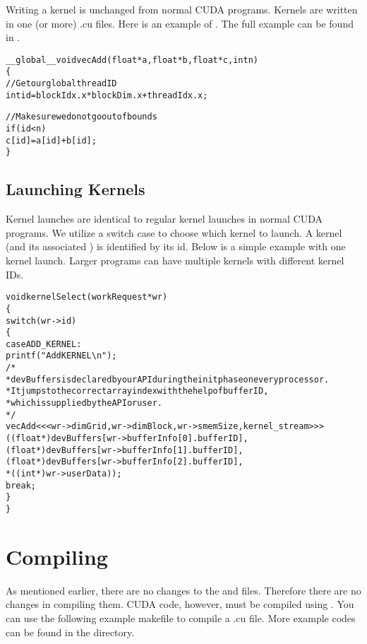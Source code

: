 \documentclass[10pt]{report}
\begin{document}
Writing a kernel is unchanged from normal CUDA programs.
Kernels are written in one (or more) .cu files.
Here is an example of .
The full example can be found in .

\begin{alltt}
__global__ void vecAdd(float *a, float *b, float *c, int n)
\{
    // Get our global thread ID
    int id = blockIdx.x * blockDim.x + threadIdx.x;

    // Make sure we do not go out of bounds
    if (id < n)
        c[id] = a[id] + b[id];
\}
\end{alltt}

\subsection{Launching Kernels}

Kernel launches are identical to regular kernel launches in normal CUDA
programs. We utilize a switch case to choose which kernel to launch.
A kernel (and its associated ) is identified by its id.
Below is a simple example with one kernel launch. Larger programs
can have multiple kernels with different kernel IDs.

\begin{alltt}
void kernelSelect(workRequest *wr)
\{
    switch (wr->id)
    \{
        case ADD_KERNEL :
            printf("Add KERNEL \textbackslash{n}");
/*
 *  devBuffers is declared by our API during the init phase on every processor.
 *  It jumps to the correct array index with the help of bufferID, 
 *  which is supplied by the API or user.
 */
            vecAdd<<< wr->dimGrid, wr->dimBlock, wr->smemSize, kernel_stream>>>
                ((float *) devBuffers[wr->bufferInfo[0].bufferID],
                 (float *) devBuffers[wr->bufferInfo[1].bufferID],
                 (float *) devBuffers[wr->bufferInfo[2].bufferID],
                 *((int *) wr->userData));
            break;
    \}
\}
\end{alltt}

\section{Compiling}

As mentioned earlier, there are no changes to the  and 
files. Therefore there are no changes in compiling them.
CUDA code, however, must be compiled using .
You can use the following example makefile to compile a .cu file.
More example codes can be found in the  directory.
\end{document}
